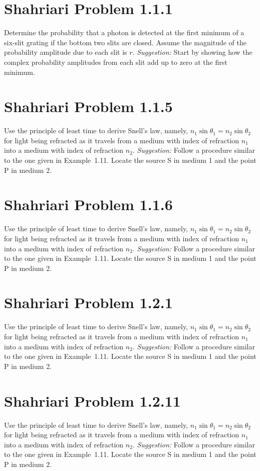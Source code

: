 \documentclass[11pt]{article}
\newif\ifclearpage
\newcommand{\problem}[1]{\section*{#1}}
\newcommand{\solution}{\hrulefill}
\newcommand{\maybeclearpage}{\ifclearpage\clearpage\fi}
\begin{document}
\problem{Shahriari Problem 1.1.1}

Determine the probability that a photon is detected at the first
minimum of a six-slit grating if the bottom two slits are closed.
Assume the magnitude of the probability amplitude due to each slit is
$r$. \emph{Suggestion:} Start by showing how the complex probability
amplitudes from each slit add up to zero at the first minimum.

\solution



\maybeclearpage
\problem{Shahriari Problem 1.1.5}

Use the principle of least time to derive Snell's law, namely, $n_1
\sin \theta_1 = n_2 \sin \theta_2$ for light being refracted as it
travels from a medium with index of refraction $n_1$ into a medium
with index of refraction $n_2$. \emph{Suggestion:} Follow a procedure
similar to the one given in Example~1.11. Locate the source S in
medium 1 and the point P in medium 2.

\solution



\maybeclearpage
\problem{Shahriari Problem 1.1.6}

Use the principle of least time to derive Snell's law, namely, $n_1
\sin \theta_1 = n_2 \sin \theta_2$ for light being refracted as it
travels from a medium with index of refraction $n_1$ into a medium
with index of refraction $n_2$. \emph{Suggestion:} Follow a procedure
similar to the one given in Example~1.11. Locate the source S in
medium 1 and the point P in medium 2.

\solution


\maybeclearpage
\problem{Shahriari Problem 1.2.1}

Use the principle of least time to derive Snell's law, namely, $n_1
\sin \theta_1 = n_2 \sin \theta_2$ for light being refracted as it
travels from a medium with index of refraction $n_1$ into a medium
with index of refraction $n_2$. \emph{Suggestion:} Follow a procedure
similar to the one given in Example~1.11. Locate the source S in
medium 1 and the point P in medium 2.

\solution


\maybeclearpage
\problem{Shahriari Problem 1.2.11}

Use the principle of least time to derive Snell's law, namely, $n_1
\sin \theta_1 = n_2 \sin \theta_2$ for light being refracted as it
travels from a medium with index of refraction $n_1$ into a medium
with index of refraction $n_2$. \emph{Suggestion:} Follow a procedure
similar to the one given in Example~1.11. Locate the source S in
medium 1 and the point P in medium 2.

\solution
\end{document}
